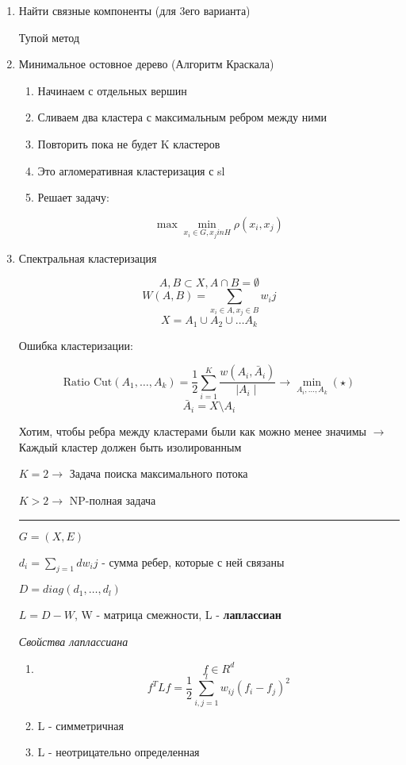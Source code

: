 \documentclass[a4paper, 12pt]{article}
\begin{document}
\begin{enumerate}
    \item Найти связные компоненты (для 3его варианта)
    
    Тупой метод
    \item Минимальное остовное дерево (Алгоритм Краскала)
    \begin{enumerate}
        \item Начинаем с отдельных вершин
        \item Сливаем два кластера с максимальным ребром между ними
        \item Повторить пока не будет K кластеров
        \item Это агломеративная кластеризация с sl
        \item Решает задачу:
        
        \[\max \min_{x_i \in G, x_j in H} \rho(x_i, x_j)\]
    \end{enumerate}
    \item Спектральная кластеризация
    
    \[A, B \subset X, A \cap B = \emptyset\]
    \[W(A, B) = \sum_{x_i \in A, x_j \in B} w_ij\]
    \[X = A_1 \cup A_2 \cup \ldots A_k\]

    Ошибка кластеризации:

    \[\textrm{Ratio Cut}(A_1, \ldots, A_k) = 
    \frac{1}{2}\sum_{i = 1}^K \frac{w(A_i, \bar{A}_i)}
    {\mid A_i \mid} \rightarrow \min_{A_i, \ldots, A_k} (\star)\]
    \[\bar{A}_i = X \setminus A_i\]

    Хотим, чтобы ребра между кластерами были как можно менее
    значимы $\rightarrow$ Каждый кластер должен быть изолированным

    $K = 2 \rightarrow$ Задача поиска максимального потока

    $K > 2 \rightarrow$ NP-полная задача

    \rule{\linewidth}{0.5pt}

    $G = (X, E)$
    
    $d_i = \sum_{j = 1}{d} w_ij$ - сумма ребер, 
    которые с ней связаны

    $D = diag(d_1, \ldots, d_l)$

    $L = D - W$, W - матрица смежности, L - \textbf{лаплассиан}

    \textit{Свойства лаплассиана}

    \begin{enumerate}
        \item \[f \in R^{d}\]
        \[f^TLf = \frac{1}{2}\sum_{i, j = 1}^l 
        w_{ij}(f_i - f_j)^2\]
        \item L - симметричная
        \item L - неотрицательно определенная
    \end{enumerate}


\end{enumerate}
\end{document}
